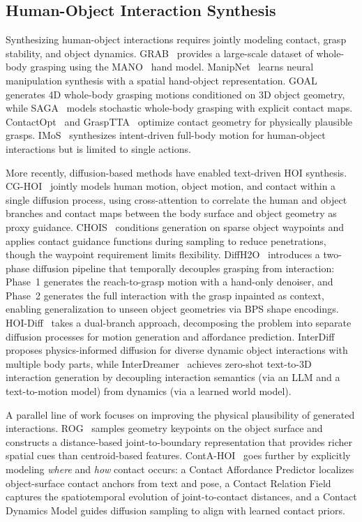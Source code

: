 \documentclass[sigconf, screen, review, anonymous]{acmart}
\begin{document}
\subsection{Human-Object Interaction Synthesis}
Synthesizing human-object interactions requires jointly modeling contact, grasp stability, and object dynamics.
GRAB~\cite{taheri2020grab} provides a large-scale dataset of whole-body grasping using the MANO~\cite{romero2022mano} hand model.
ManipNet~\cite{zhang2021manipnet} learns neural manipulation synthesis with a spatial hand-object representation.
GOAL~\cite{taheri2022goal} generates 4D whole-body grasping motions conditioned on 3D object geometry, while SAGA~\cite{wu2022saga} models stochastic whole-body grasping with explicit contact maps.
ContactOpt~\cite{grady2021contactopt} and GraspTTA~\cite{jiang2021graspTTA} optimize contact geometry for physically plausible grasps.
IMoS~\cite{ghosh2023imos} synthesizes intent-driven full-body motion for human-object interactions but is limited to single actions.

More recently, diffusion-based methods have enabled text-driven HOI synthesis.
CG-HOI~\cite{li2024cghoi} jointly models human motion, object motion, and contact within a single diffusion process, using cross-attention to correlate the human and object branches and contact maps between the body surface and object geometry as proxy guidance.
CHOIS~\cite{li2024chois} conditions generation on sparse object waypoints and applies contact guidance functions during sampling to reduce penetrations, though the waypoint requirement limits flexibility.
DiffH2O~\cite{christen2024diffh2o} introduces a two-phase diffusion pipeline that temporally decouples grasping from interaction: Phase~1 generates the reach-to-grasp motion with a hand-only denoiser, and Phase~2 generates the full interaction with the grasp inpainted as context, enabling generalization to unseen object geometries via BPS shape encodings.
HOI-Diff~\cite{peng2023hoidiff} takes a dual-branch approach, decomposing the problem into separate diffusion processes for motion generation and affordance prediction.
InterDiff~\cite{xu2023interdiff} proposes physics-informed diffusion for diverse dynamic object interactions with multiple body parts, while InterDreamer~\cite{xu2024interdreamer} achieves zero-shot text-to-3D interaction generation by decoupling interaction semantics (via an LLM and a text-to-motion model) from dynamics (via a learned world model).

A parallel line of work focuses on improving the physical plausibility of generated interactions.
ROG~\cite{xue2025rog} samples geometry keypoints on the object surface and constructs a distance-based joint-to-boundary representation that provides richer spatial cues than centroid-based features.
ContA-HOI~\cite{li2025contahoi} goes further by explicitly modeling \emph{where} and \emph{how} contact occurs: a Contact Affordance Predictor localizes object-surface contact anchors from text and pose, a Contact Relation Field captures the spatiotemporal evolution of joint-to-contact distances, and a Contact Dynamics Model guides diffusion sampling to align with learned contact priors.
\end{document}
